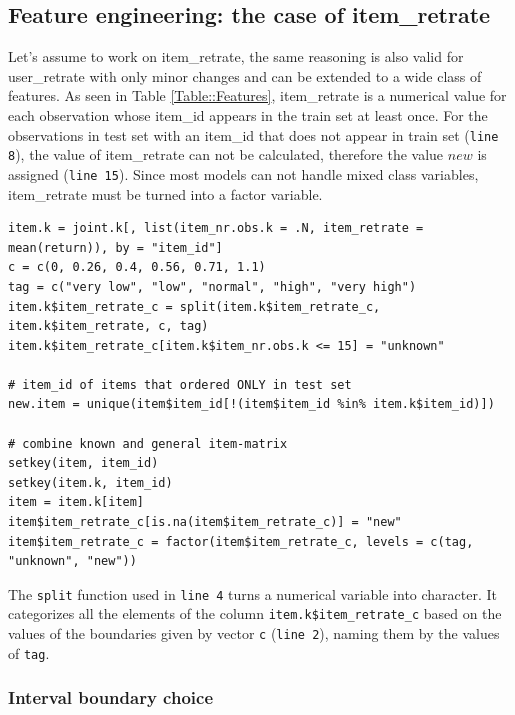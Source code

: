 \documentclass[a4paper,12pt]{article}
\begin{document}
\subsection{Feature engineering: the case of item\_retrate}\label{Subsec::ItemRetrate}
Let's assume to work on item\_retrate, the same reasoning is also valid for user\_retrate with only minor changes and can be extended to a wide class of features.
\newline
As seen in Table \ref{Table::Features}, item\_retrate is a numerical value for each observation whose item\_id appears in the train set at least once. 
For the observations in test set with an item\_id that does not appear in train set (\texttt{line 8}), the value of item\_retrate can not be calculated, therefore the value $new$ is assigned (\texttt{line 15}). Since most models can not handle mixed class variables, item\_retrate must be turned into a factor variable. 
\\
\begin{lstlisting}
item.k = joint.k[, list(item_nr.obs.k = .N, item_retrate = mean(return)), by = "item_id"]
c = c(0, 0.26, 0.4, 0.56, 0.71, 1.1)
tag = c("very low", "low", "normal", "high", "very high")
item.k$item_retrate_c = split(item.k$item_retrate_c, item.k$item_retrate, c, tag)
item.k$item_retrate_c[item.k$item_nr.obs.k <= 15] = "unknown"

# item_id of items that ordered ONLY in test set
new.item = unique(item$item_id[!(item$item_id %in% item.k$item_id)])

# combine known and general item-matrix
setkey(item, item_id)
setkey(item.k, item_id)
item = item.k[item]
item$item_retrate_c[is.na(item$item_retrate_c)] = "new"
item$item_retrate_c = factor(item$item_retrate_c, levels = c(tag, "unknown", "new"))

\end{lstlisting}

The \texttt{split} function used in \texttt{line 4} turns a numerical variable into character. It categorizes all the elements of the column \texttt{item.k\$item\_retrate\_c} based on the values of the boundaries given by vector \texttt{c} (\texttt{line 2}), naming them by the values of \texttt{tag}.

\subsubsection{Interval boundary choice}\label{Subsec::Interval}
\end{document}
